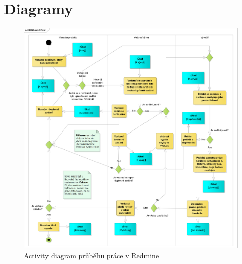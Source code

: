 \chapter{Diagramy} \label{ap:diagrams}

\begin{figure}
\includegraphics[width=\textwidth]{../png/activity.png}
\caption{Activity diagram průběhu práce v Redmine} \label{picture:activity}
\end{figure}
